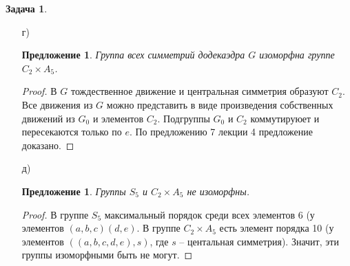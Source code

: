 \documentclass[12pt]{article}
\newtheorem{predl}[theorem]{Предложение}
\theoremstyle{definition}
\newtheorem{zad}{Задача}[section]
\begin{document}
\begin{zad}
\begin{itemize}
\begin{proof}
\begin{enumerate}
        \item $(1,2,3,5,4)$, $(1,2,4,3,5)$, $(1,2,5,4,3)$, $(1,3,2,4,5)$, $(1,3,4,5,2)$, $(1,3,5,2,4)$, $(1,4,2,5,3)$, $(1,4,3,2,5)$, $(1,4,5,3,2)$, $(1,5,2,3,4)$, $(1,5,3,4,2)$, $(1,5,4,2,3)$\\ (циклы длины 5, 12 шт.) -- $r_2$.
        \item $(a,b,c)$ (циклы длины 3, 20 шт.) -- $r_3$.
        \item $(a,b)(c,d)$ (произведение транспозиций, 15 шт.) -- $r_4$.
    \end{enumerate}
    Таким образом, построено однозначное соответствие между перестановками и движениями, сохраняющее групповые операции, а значит изоморфизм групп построен.
    \end{proof}
    \item[г)]
    \begin{predl}
        Группа всех симметрий додекаэдра $G$ изоморфна группе $C_2\times A_5$.
    \end{predl}
    \begin{proof}
        В $G$ тождественное движение и центральная симметрия образуют $C_2$.
        Все движения из $G$ можно представить в виде произведения собственных движений из $G_0$ и элементов $C_2$. Подгруппы $G_0$ и $C_2$ коммутируюет и пересекаются только по $e$. По предложению 7 лекции 4 предложение доказано.
    \end{proof}
    \item[д)]
    \begin{predl}
        Группы $S_5$ и $C_2\times A_5$ не изоморфны.
    \end{predl}
    \begin{proof}
        В группе $S_5$ максимальный порядок среди всех элементов 6 (у элементов $(a,b,c)(d,e)$. В группе $C_2\times A_5$ есть элемент порядка 10 (у элементов $((a,b,c,d,e),s)$, где $s$ -- центальная симметрия). Значит, эти группы изоморфными быть не могут.
    \end{proof}
    \end{itemize}
\end{zad}
\end{document}
